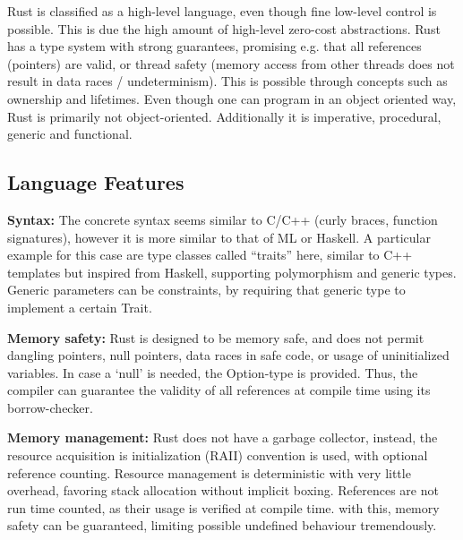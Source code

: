 Rust is classified as a high-level language, even though fine low-level control
is possible. This is due the high amount of high-level zero-cost abstractions.
Rust has a type system with strong guarantees, promising e.g. that all
references (pointers) are valid, or thread safety (memory access from other
threads does not result in data races / undeterminism). This is possible
through concepts such as ownership and lifetimes. Even though one can program
in an object oriented way, Rust is primarily not object-oriented. Additionally
it is imperative, procedural, generic and functional.

\subsection{Language Features}\label{sec:RustFeatures}

\textbf{Syntax:}\label{sec:syntax}
The concrete syntax seems similar to C/C++ (curly braces, function signatures),
however it is more similar to that of ML or Haskell. A particular example for
this case are type classes called ``traits'' here, similar to C++ templates but
inspired from Haskell, supporting polymorphism and generic types. Generic
parameters can be constraints, by requiring that generic type to implement a
certain Trait.

\textbf{Memory safety:}\label{sec:memsafe}
Rust is designed to be memory safe, and does not permit dangling pointers, null
pointers, data races in safe code, or usage of uninitialized variables. In case
a `null' is needed, the Option-type is provided. Thus, the compiler can
guarantee the validity of all references at compile time using its
borrow-checker.


\textbf{Memory management:}\label{sec:memmanage}
Rust does not have a garbage collector, instead, the resource acquisition is
initialization (RAII) convention is used, with optional reference counting.
Resource management is deterministic with very little overhead, favoring stack
allocation without implicit boxing. References are not run time counted, as
their usage is verified at compile time. with this, memory safety can be
guaranteed, limiting possible undefined behaviour tremendously.

